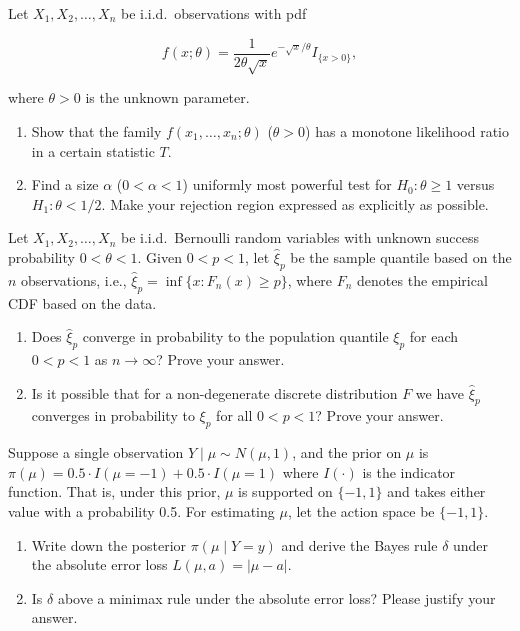 \documentclass[11pt,a4paper]{article}
\newcommand{\examstatement}[1]{%
  \par\addvspace{0.85em}%
  \noindent{\bfseries #1}\par\nobreak\addvspace{0.28em}%
}
\begin{document}
\examstatement{Problem 7. [10 pts.]}
Let \( X_1, X_2, \dots, X_n \) be i.i.d.\ observations with pdf

\[
f(x; \theta) = \frac{1}{2\theta\sqrt{x}} e^{-\sqrt{x}/\theta} I_{\{x>0\}},
\]

where \( \theta > 0 \) is the unknown parameter.
\begin{enumerate}[label=(\alph*)]
    \item Show that the family \( f(x_1, \dots, x_n; \theta) \) (\( \theta > 0 \)) has a monotone likelihood ratio in a certain statistic \( T \).
    \item Find a size \( \alpha \) (\( 0 < \alpha < 1 \)) uniformly most powerful test for \( H_0 : \theta \ge 1 \) versus \( H_1 : \theta < 1/2 \). Make your rejection region expressed as explicitly as possible.
\end{enumerate}

\examstatement{Problem 8. [15 pts.]}
Let \( X_1, X_2, \dots, X_n \) be i.i.d.\ Bernoulli random variables with unknown success probability \( 0 < \theta < 1 \). Given \( 0 < p < 1 \), let \( \hat{\xi}_p \) be the sample quantile based on the \( n \) observations, i.e., \( \hat{\xi}_p = \inf\{x : F_n(x) \ge p\} \), where \( F_n \) denotes the empirical CDF based on the data.
\begin{enumerate}[label=(\alph*)]
    \item Does \( \hat{\xi}_p \) converge in probability to the population quantile \( \xi_p \) for each \( 0 < p < 1 \) as \( n \to \infty \)? Prove your answer.
    \item Is it possible that for a non-degenerate discrete distribution \( F \) we have \( \hat{\xi}_p \) converges in probability to \( \xi_p \) for all \( 0 < p < 1 \)? Prove your answer.
\end{enumerate}

\examstatement{Problem 9. [10 pts.]}
Suppose a single observation \( Y \mid \mu \sim N(\mu, 1) \), and the prior on \( \mu \) is \( \pi(\mu) = 0.5 \cdot I(\mu = -1) + 0.5 \cdot I(\mu = 1) \) where \( I(\cdot) \) is the indicator function. That is, under this prior, \( \mu \) is supported on \( \{-1, 1\} \) and takes either value with a probability 0.5. For estimating \( \mu \), let the action space be \( \{-1, 1\} \).
\begin{enumerate}[label=(\alph*)]
    \item Write down the posterior \( \pi(\mu \mid Y = y) \) and derive the Bayes rule \( \delta \) under the absolute error loss \( L(\mu, a) = |\mu - a| \).
    \item Is \( \delta \) above a minimax rule under the absolute error loss? Please justify your answer.
\end{enumerate}
\end{document}
